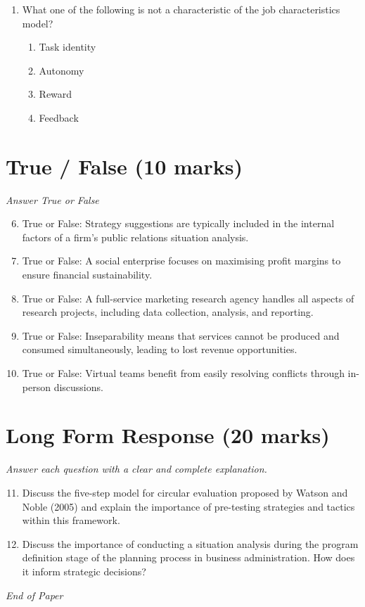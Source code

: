 \documentclass[12pt]{article}
\begin{document}
\begin{enumerate}[label=\arabic*.]
\begin{enumerate}[label=(\alph*)]
    \item Legal environment.
    \item Economic environment.
    \item Ecological environment.
\end{enumerate}
\item What one of the following is not a characteristic of the job characteristics model?
\begin{enumerate}[label=(\alph*)]
    \item Task identity
    \item Autonomy
    \item Reward
    \item Feedback
\end{enumerate}
\end{enumerate}

\section*{True / False (10 marks)}
\textit{Answer True or False}
\begin{enumerate}[label=\arabic*.]
\setcounter{enumi}{5}
\item True or False: Strategy suggestions are typically included in the internal factors of a firm's public relations situation analysis.
\item True or False: A social enterprise focuses on maximising profit margins to ensure financial sustainability.
\item True or False: A full-service marketing research agency handles all aspects of research projects, including data collection, analysis, and reporting.
\item True or False: Inseparability means that services cannot be produced and consumed simultaneously, leading to lost revenue opportunities.
\item True or False: Virtual teams benefit from easily resolving conflicts through in-person discussions.
\end{enumerate}

\section*{Long Form Response (20 marks)}
\textit{Answer each question with a clear and complete explanation.}
\begin{enumerate}[label=\arabic*.]
\setcounter{enumi}{10}
\item Discuss the five-step model for circular evaluation proposed by Watson and Noble (2005) and explain the importance of pre-testing strategies and tactics within this framework.
\item Discuss the importance of conducting a situation analysis during the program definition stage of the planning process in business administration. How does it inform strategic decisions?
\end{enumerate}

\vfill
\noindent\textit{End of Paper}
\end{document}
